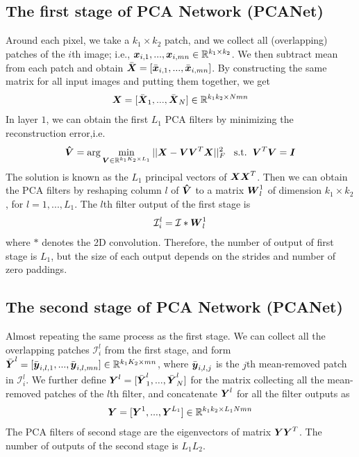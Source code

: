 \documentclass[10pt,twocolumn,letterpaper]{article}
\begin{document}
\subsection{The first stage of PCA Network (PCANet)}
Around each pixel, we take a $k_1 \times k_2$ patch, and we collect all (overlapping) patches of the $i$th image; i.e., $\boldsymbol{x}_{i,1},...,\boldsymbol{x}_{i,mn} \in \mathbb{R}^{k_1\times k_2}$. We then subtract mean from each patch and obtain $\bar{\boldsymbol{X}} = [\bar{\boldsymbol{x}}_{i,1},...,\bar{\boldsymbol{x}}_{i,mn}] $. By constructing the same matrix for all input images and putting them together, we get
\begin{eqnarray}
	\boldsymbol{X} = [\bar{\boldsymbol{X}}_1,...,\bar{\boldsymbol{X}}_N] \in \mathbb{R}^{k_1k_2\times Nmn}
\end{eqnarray}
In layer $1$, we can obtain the first $L_1$ PCA filters by minimizing the reconstruction error,i.e.
\begin{eqnarray}
	\boldsymbol{\hat{V}} = \arg\min_{\boldsymbol{V}\in \mathbb{R}^{k_1K_2\times L_1}} ||\boldsymbol{X}-\boldsymbol{VV}^T\boldsymbol{X}||^2_F  \hspace{0.3cm} \textrm{s.t.} \hspace{0.2cm} \boldsymbol{V}^T\boldsymbol{V} = \boldsymbol{I}
\end{eqnarray}
The solution is known as the $L_1$ principal vectors of $\boldsymbol{XX}^T$. Then we can obtain the PCA filters by reshaping column $l$ of $\boldsymbol{\hat{V}}$ to a matrix $\boldsymbol{W}_l^1$ of dimension $k_1\times k_2$, for $l=1,...,L_1$. The $l$th filter output of the first stage is
\begin{eqnarray}
	\mathcal{I}_i^l =  \mathcal{I} * \boldsymbol{W}_l^1
\end{eqnarray}
where $*$ denotes the 2D convolution. Therefore, the number of output of first stage is $L_1$, but the size of each output depends on the strides and number of zero paddings.



\subsection{The second stage of PCA Network (PCANet)}
Almost repeating the same process as the first stage. We can collect all the overlapping patches $\mathcal{I}_i^l$ from the first stage, and form $\bar{\boldsymbol{Y}}^l = [\bar{\boldsymbol{y}}_{i,l,1},...,\bar{\boldsymbol{y}}_{i,l,mn}]  \in \mathbb{R}^{k_1K_2\times mn}$, where $\bar{\boldsymbol{y}}_{i,l,j}$ is the $j$th mean-removed patch in $\mathcal{I}_i^l$. We further define $\boldsymbol{Y}^l = [\bar{\boldsymbol{Y}}_1^l,...,\bar{\boldsymbol{Y}}_N^l]$ for the matrix collecting all the mean-removed patches of the $l$th filter, and concatenate $\boldsymbol{Y}^l$ for all the filter outputs as 
\begin{eqnarray}
	\boldsymbol{Y} = [\boldsymbol{Y}^1,...,\boldsymbol{Y}^{L_1}] \in \mathbb{R}^{k_1k_2\times L_1Nmn}
\end{eqnarray} 
The PCA filters of second stage are the eigenvectors of matrix $\boldsymbol{YY}^T$. The number of outputs of the second stage is $L_1L_2$. 
\end{document}
